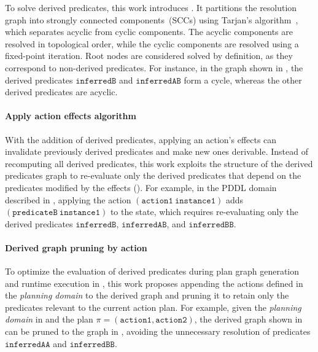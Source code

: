 To solve derived predicates, this work introduces . It partitions the resolution graph into strongly connected components~(SCCs) using Tarjan's algorithm~\cite{doi:10.1137/0201010}, which separates acyclic from cyclic components. The acyclic components are resolved in topological order, while the cyclic components are resolved using a fixed-point iteration. Root nodes are considered solved by definition, as they correspond to non-derived predicates. For instance, in the graph shown in , the derived predicates $\texttt{inferredB}$ and $\texttt{inferredAB}$ form a cycle, whereas the other derived predicates are acyclic.

\paragraph{Apply action effects algorithm}

With the addition of derived predicates, applying an action's effects can invalidate previously derived predicates and make new ones derivable. Instead of recomputing all derived predicates, this work exploits the structure of the derived predicates graph to re-evaluate only the derived predicates that depend on the predicates modified by the effects (). For example, in the PDDL domain described in , applying the action $(\texttt{action1}~\texttt{instance1})$ adds $(\texttt{predicateB}~\texttt{instance1})$ to the state, which requires re-evaluating only the derived predicates $\texttt{inferredB}$, $\texttt{inferredAB}$, and $\texttt{inferredBB}$.

\paragraph{Derived graph pruning by action}

To optimize the evaluation of derived predicates during plan graph generation and runtime execution in \plansys, this work proposes appending the actions defined in the \emph{planning domain} to the derived graph and pruning it to retain only the predicates relevant to the current action plan. For example, given the \emph{planning domain} in  and the plan \(\pi = (\texttt{action1}, \texttt{action2})\), the derived graph shown in  can be pruned to the graph in , avoiding the unnecessary resolution of predicates \(\texttt{inferredAA}\) and \(\texttt{inferredBB}\).


